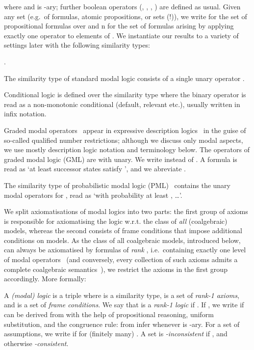 \documentclass[proceedings]{stacs}
\theoremstyle{definition}
\theoremstyle{plain}
\newcounter{blubber}
\newenvironment{sparenumerate}
{\begin{list}
  {\arabic{blubber}.}
  {\usecounter{blubber}
   \setlength{\leftmargin}{0pt}
    \setlength{\parsep}{0pt}
    \setlength{\itemindent}{3ex}
    \setlength{\itemsep}{2pt}   
    \setlength{\listparindent}{3ex}
  }
}
{\end{list}}
\begin{document}
where  and  is -ary; further boolean
operators (, , , ) are defined as
usual.  Given any set  (e.g.\ of formulas, atomic propositions, or
sets (!)), we write  for the set of propositional formulas
over  and n for the set
of formulas arising by applying exactly one operator to elements of
.  We instantiate our results to a variety of settings later with
the following similarity types:
\begin{exas} \label{expl:sim-types}
\begin{sparenumerate}
\item The similarity type  of standard modal logic consists of a
single unary operator .
\item Conditional logic \cite{Chellas80} is defined over the
  similarity type  where the binary
  operator  is read as a non-monotonic conditional (default,
  relevant etc.), usually written in infix notation.
\item Graded modal operators~\cite{Fine72} appear in expressive
  description logics~\cite{BaaderEA03} in the guise of so-called
  qualified number restrictions; although we discuss only modal
  aspects, we use mostly description logic notation and terminology
  below. The operators of graded modal logic (GML) are  with  unary.
  We write  instead of . A formula
   is read as `at least  successor states satisfy
  ', and we abreviate .
\item The similarity type  of probabilistic modal logic
  (PML)~\cite{LarsenSkou91} contains the unary modal operators 
  for , read as `with probability at
  least , \dots'.
\end{sparenumerate}
\end{exas}
\noindent We split axiomatisations of modal logics into two parts: the
first group of axioms is responsible for axiomatising the logic
w.r.t. the class of \emph{all} (coalgebraic) models, whereas the
second consists of frame conditions that impose additional conditions
on models. As the class of all coalgebraic models, introduced below,
can always be axiomatised by formulas of \emph{rank }, i.e.\
containing exactly one level of modal operators~\cite{Schroder07} (and
conversely, every collection of such axioms admits a complete
coalgebraic semantics~\cite{SchroderPattinson07mcs}), we restrict the
axioms in the first group accordingly.  More formally:
\begin{defi}
  A \emph{(modal) logic} is a triple 
  where  is a similarity type,  is a set of \emph{rank-1 axioms},
  and  is a set of \emph{frame
    conditions}. We say that  is a \emph{rank-1 logic} if
  . If , we write
   if  can be derived from  with the help of propositional reasoning, uniform
  substitution, and the congruence rule: from  infer  whenever  is
  -ary. For a set  of assumptions,
  we write  if  for (finitely many) . A set  is \emph{-inconsistent}
  if , and otherwise
  \emph{-consistent}.
\end{defi}
\end{document}
